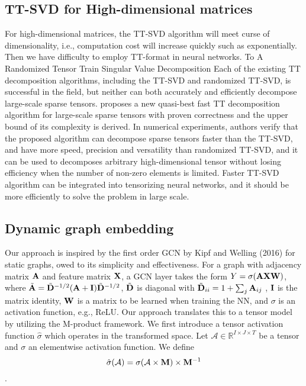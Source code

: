 \documentclass[onecolumn, conference]{IEEEtran}
\begin{document}
\subsection{TT-SVD for High-dimensional matrices}
For high-dimensional matrices, the TT-SVD algorithm will meet curse of dimensionality, i.e., computation cost will increase quickly such as exponentially. Then we have difficulty to employ TT-format in neural networks. To 
A Randomized Tensor Train Singular Value
Decomposition
Each of the existing TT decomposition algorithms,
including the TT-SVD and randomized TT-SVD, is successful in the field, but
neither can both accurately and efficiently decompose large-scale sparse tensors. \cite{b13} proposes a new quasi-best fast TT
decomposition algorithm for large-scale sparse tensors with proven correctness
and the upper bound of its complexity is derived. In numerical experiments,
authors verify that the proposed algorithm can decompose sparse tensors faster than
the TT-SVD, and have more speed, precision and versatility than randomized
TT-SVD\cite{b14}, and it can be used to decomposes arbitrary high-dimensional tensor
without losing efficiency when the number of non-zero elements is limited. 
Faster TT-SVD algorithm can be integrated into tensorizing neural networks, and it should be more efficiently to solve the problem in large scale.


\subsection{Dynamic graph embedding}
Our approach is inspired by the first order GCN by Kipf and Welling (2016) for static graphs, owed to its simplicity and effectiveness. For a graph with adjacency matrix ${\bf A}$ and feature matrix ${\bf X}$, a
GCN layer takes the form $Y = \sigma({\bf AXW})$, where $\tilde{\bf A} = \tilde{\bf D}^{-1/2}({\bf A} + {\bf I})\tilde{\bf D}^{-1/2}$, $\tilde{\bf D}$ is diagonal with $\tilde{\bf D}_{ii} = 1 + \sum_j {\bf A}_{ij}$ , ${\bf I}$ is the matrix identity, ${\bf W}$ is a matrix to be learned when
training the NN, and $\sigma$ is an activation function, e.g., ReLU. 
Our approach translates this to a tensor model by utilizing the M-product framework. We first introduce a tensor activation function $\hat{\sigma}$ which operates in the transformed space.
Let $\mathcal{A} \in \mathbb{R}^{I\times J\times T}$ be a tensor and $\sigma$ an elementwise activation function. We define $$\hat{\sigma}(\mathcal{A}) = \sigma(\mathcal{A}\times {\bf M})\times {\bf M}^{-1}$$.
\end{document}
